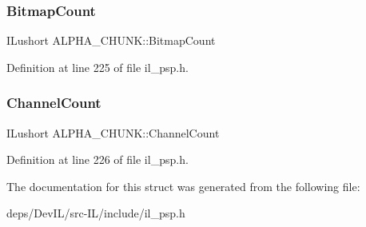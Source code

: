 \subsubsection{\texorpdfstring{Bitmap\+Count}{BitmapCount}}
{\footnotesize\ttfamily I\+Lushort A\+L\+P\+H\+A\+\_\+\+C\+H\+U\+N\+K\+::\+Bitmap\+Count}



Definition at line 225 of file il\+\_\+psp.\+h.

\mbox{\label{structALPHA__CHUNK_a41ef694f2c9904553eef013beb5e99b3}} 
\subsubsection{\texorpdfstring{Channel\+Count}{ChannelCount}}
{\footnotesize\ttfamily I\+Lushort A\+L\+P\+H\+A\+\_\+\+C\+H\+U\+N\+K\+::\+Channel\+Count}



Definition at line 226 of file il\+\_\+psp.\+h.



The documentation for this struct was generated from the following file\+:\begin{DoxyCompactItemize}
\item 
deps/\+Dev\+I\+L/src-\/\+I\+L/include/il\+\_\+psp.\+h\end{DoxyCompactItemize}
